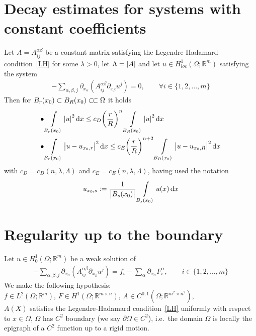 \section{Decay estimates for systems with constant coefficients}

\begin{lem}[]
	Let \( A=A_{ij}^{\alpha \beta } \) be a constant matrix satisfying the Legendre-Hadamard condition~\eqref{LH} for some \( \lambda > 0 \), let \( \Lambda = \abs{A} \) and let \( u \in  H_{loc}^{1}(\Omega ; \mathbb{R}^{m})  \) satisfying the system
	\begin{gather}
		- \sum\limits_{\alpha, \beta, j}^{} \partial_{x_{\alpha }} \left( A_{ij}^{\alpha \beta } \partial_{x_{\beta}}  u^{j} \right) = 0, \qquad \forall  i \in \{ 1,2,\ldots , m \}
	\end{gather}
	Then for \( B_{r}(x_{0}) \subset  B_{R}(x_{0}) \ssubset \Omega  \) it holds
	\begin{align}
		\bullet & \int\limits_{B_{r}(x_{0})}^{} \abs{u}^{2} \dd{x} \leq c_{D} {\left( \frac{r}{R} \right)}^{n} \int\limits_{B_{R}(x_{0})}^{} \abs{u}^{2} \dd{x}  \\
		\bullet & \int\limits_{B_{r}(x_{0})}^{} \abs{u-u_{x_{0},r}}^{2} \dd{x} \leq c_{E} {\left( \frac{r}{R} \right)}^{n+2} \int\limits_{B_{R}(x_{0})}^{} \abs{u-u_{x_{0},R}}^{2} \dd{x}
	\end{align}
	with \( c_{D}=c_{D}(n,\lambda, \Lambda  ) \) and \( c_{E}=c_{E}(n, \lambda , \Lambda ) \), having used the notation
	\begin{gather}
		u_{x_{0},s}:= \frac{1}{\abs{B_{s}(x_{0})}} \int\limits_{B_{s}(x_{0})}^{} u(x)  \dd{x}
	\end{gather}
\end{lem}

\section{Regularity up to the boundary}

Let \( u \in H_{0}^{1}(\Omega ; \mathbb{R}^{m})  \) be a weak solution of
\begin{gather}
	- \sum\limits_{\alpha, \beta, j}^{} \partial_{x_{\alpha }} \left( A_{ij}^{\alpha \beta } \partial_{x_{\beta}}  u^{j} \right) = f_{i} - \sum\limits_{\alpha }^{} \partial_{x_{\alpha }} F_{i}^{\alpha }, \qquad i \in \{ 1,2,\ldots,m \}
\end{gather}
We make the following hypothesis: \\
\( f \in L^{2}(\Omega ; \mathbb{R}^{m}) \), \( F \in H^{1}(\Omega ; \mathbb{R}^{m \times n})  \), \( A \in C^{0,1}(\Omega ; \mathbb{R}^{m^{2}\times n^{2}})  \), \\
\( A(X)  \) satisfies the Legendre-Hadamard condition~\eqref{LH} uniformly with respect to \( x \in \Omega  \), \( \Omega  \) has \( C^{2} \) boundary (we say \( \partial \Omega \in  C^{2} \)), i.e.\ the domain \( \Omega  \) is locally the epigraph of a \( C^{2} \) function up to a rigid motion.

